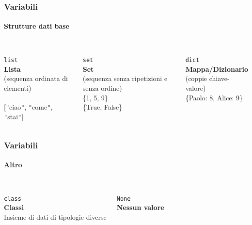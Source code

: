 \begin{contentframe}
    \frametitle{Variabili}
    \framesubtitle{Strutture dati base}

    \begin{columns}
        \centering
        {\Huge\faListOl}\\
        \bigskip
        \texttt{list}\\
        \textbf{Lista}\\
        (sequenza ordinata di elementi)\\
        \bigskip
        [1, 2, 2, 3]\\
        
        [\texttt{"}ciao\texttt{"}, \texttt{"}come\texttt{"}, \texttt{"}stai\texttt{"}]

        \centering
        {\Huge\faBars}\\
        \bigskip
        \texttt{set}\\
        \textbf{Set}\\
        (sequenza senza ripetizioni e senza ordine)\\
        \bigskip
        \{1, 5, 9\}\\
        \{True, False\}

        \centering
        {\Huge\faThList}\\
        \bigskip
        \texttt{dict}\\
        \textbf{Mappa/Dizionario}\\
        (coppie chiave-valore)\\
        \bigskip
        \bigskip
        \{\textquotesingle{}Paolo\textquotesingle{}: 8, \textquotesingle{}Alice\textquotesingle{}: 9\}
        \bigskip
    \end{columns}
\end{contentframe}

\begin{contentframe}
    \frametitle{Variabili}
    \framesubtitle{Altro}

    \begin{columns}
        \centering
        {\Huge\faSitemap}\\
        \bigskip
        \texttt{class}\\
        \textbf{Classi}\\
        \bigskip
        Insieme di dati di tipologie diverse

        \centering
        {\Huge\faTimes}\\
        \bigskip
        \texttt{None}\\
        \textbf{Nessun valore}\\
        \bigskip
        \bigskip
    \end{columns}
\end{contentframe}

